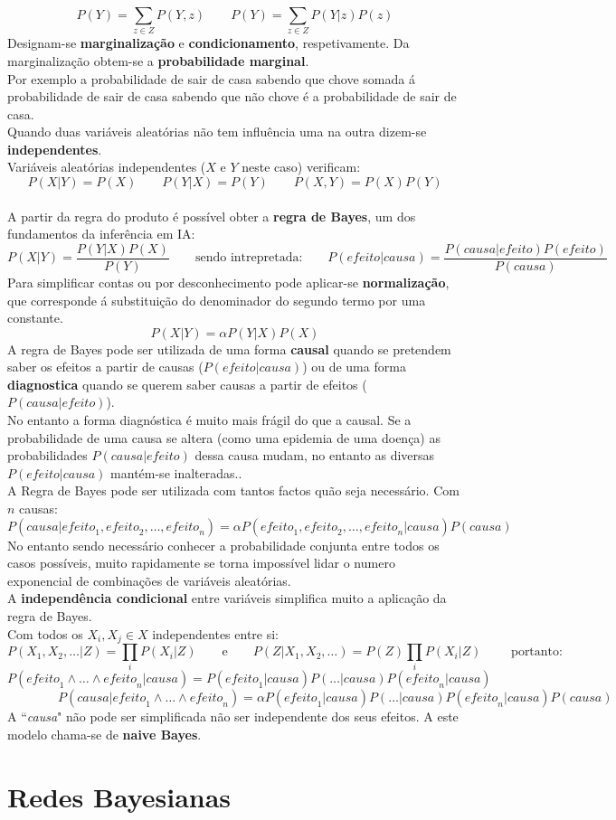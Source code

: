 \documentclass[]{report}
\begin{document}
$$P(Y) = \sum_{z \in Z}{P(Y, z)} \qquad P(Y) = \sum_{z \in Z}{P(Y| z)P(z)}$$
Designam-se \textbf{marginalização} e \textbf{condicionamento}, respetivamente. Da marginalização obtem-se a \textbf{probabilidade marginal}.\\
Por exemplo a probabilidade de sair de casa sabendo que chove somada á probabilidade de sair de casa sabendo que não chove é a probabilidade de sair de casa.\\[5mm]
Quando duas variáveis aleatórias não tem influência uma na outra dizem-se \textbf{independentes}.\\
Variáveis aleatórias independentes ($X$ e $Y$ neste caso) verificam:
$$P(X|Y)=P(X) \qquad P(Y|X)=P(Y) \qquad P(X,Y) = P(X)P(Y)$$\\[5mm]
A partir da regra do produto é possível obter a \textbf{regra de Bayes}, um dos fundamentos da inferência em IA:
$$P(X|Y)=\frac{P(Y|X)P(X)}{P(Y)} \qquad \text{sendo intrepretada:} \qquad 
P(\textit{efeito}|\textit{causa})=\frac{P(\textit{causa}|\textit{efeito})P(\textit{efeito})}{P(\textit{causa})}$$
Para simplificar contas ou por desconhecimento pode aplicar-se \textbf{normalização}, que corresponde á substituição do denominador do segundo termo por uma constante.
$$P(X|Y) = \alpha P(Y|X)P(X)$$
A regra de Bayes pode ser utilizada de uma forma \textbf{causal} quando se pretendem saber os efeitos a partir de causas ($P(\textit{efeito}|\textit{causa})$) ou de uma forma \textbf{diagnostica} quando se querem saber causas a partir de efeitos ($P(\textit{causa}|\textit{efeito})$).\\[2mm]
No entanto a forma diagnóstica é muito mais frágil do que a causal. Se a probabilidade de uma causa se altera (como uma epidemia de uma doença) as probabilidades $P(\textit{causa}|\textit{efeito})$ dessa causa mudam, no entanto as diversas $P(\textit{efeito}|\textit{causa})$ mantém-se inalteradas..\\[5mm]
A Regra de Bayes pode ser utilizada com tantos factos quão seja necessário. Com $n$ causas:
$$P(\textit{causa}|\textit{efeito}_1,\textit{efeito}_2, \dots, \textit{efeito}_n) =
\alpha P(\textit{efeito}_1,\textit{efeito}_2, \dots, \textit{efeito}_n| \textit{causa}) P(\textit{causa})$$
No entanto sendo necessário conhecer a probabilidade conjunta entre todos os casos possíveis, muito rapidamente se torna impossível lidar o numero exponencial de combinações de variáveis aleatórias.\\[2mm]
A \textbf{independência condicional} entre variáveis simplifica muito a aplicação da regra de Bayes.\\
Com todos os $X_i,X_j \in X$ independentes entre si:
$$P(X_1,X_2,\dots|Z)=\prod_i P(X_i | Z) \qquad \text{e} \qquad P(Z | X_1,X_2,\dots)= P(Z)\prod_i P(X_i | Z) \qquad \text{ portanto:}$$
$$P(\textit{efeito}_1 \wedge \dots \wedge \textit{efeito}_n|\textit{causa}) =
P(\textit{efeito}_1|\textit{causa})P(\dots|\textit{causa})P(\textit{efeito}_n|\textit{causa})$$
$$\qquad\qquad P(\textit{causa}|\textit{efeito}_1 \wedge \dots \wedge \textit{efeito}_n) =
\alpha P(\textit{efeito}_1|\textit{causa})P(\dots|\textit{causa})P(\textit{efeito}_n|\textit{causa})P(\textit{causa})$$
A ``\textit{causa}" não pode ser simplificada não ser independente dos seus efeitos. A este modelo chama-se de \textbf{naive Bayes}.
\section{Redes Bayesianas}
\end{document}
